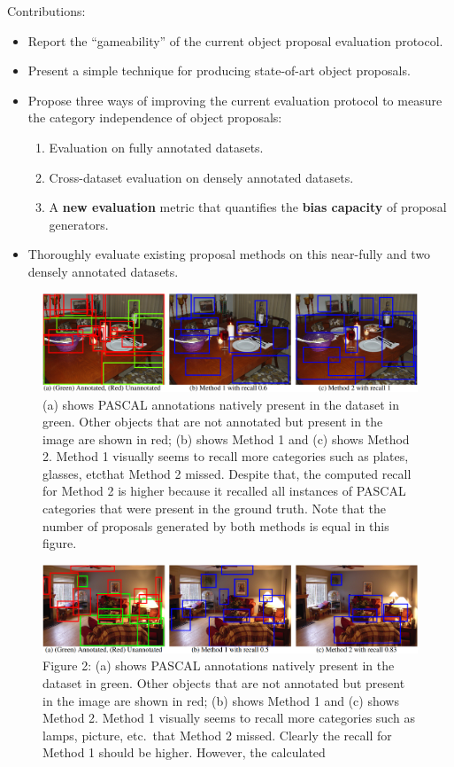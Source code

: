 \documentclass[10pt]{article}
\begin{document}
Contributions:
%
\begin{itemize}
  \item Report the ``gameability'' of the current object proposal evaluation
    protocol.
  \item Present a simple technique for producing state-of-art object proposals.
  \item Propose three ways of improving the current evaluation protocol to
    measure the category independence of object proposals:
    \begin{enumerate}
      \item Evaluation on fully annotated datasets.
      \item Cross-dataset evaluation on densely annotated datasets.
      \item A \textbf{new evaluation} metric that quantifies the
        \textbf{bias capacity} of proposal generators.
    \end{enumerate}
  \item Thoroughly evaluate existing proposal methods on this near-fully and
    two densely annotated datasets.
\end{itemize}
%
\begin{figure}[htpb]
  \centering
  \includegraphics[width=0.8\linewidth]{fig_1.png}
  \caption{(a) shows PASCAL annotations natively present in the dataset in
    green. Other objects that are not annotated but present in the image are
    shown in red; (b) shows Method 1 and (c) shows Method 2. Method 1 visually
    seems to recall more categories such as plates, glasses, etc\. that Method
    2 missed. Despite that, the computed recall for Method 2 is higher because
    it recalled all instances of PASCAL categories that were present in the
    ground truth. Note that the number of proposals generated by both methods
    is equal in this figure.}%
  \label{fig:1}
\end{figure}

\begin{figure}[htpb]
  \centering
  \includegraphics[width=0.8\linewidth]{fig_2.png}
  \caption{Figure 2: (a) shows PASCAL annotations natively present in the
    dataset in green. Other objects that are not annotated but present in the
    image are shown in red; (b) shows Method 1 and (c) shows Method 2. Method 1
    visually seems to recall more categories such as lamps, picture, etc.\ that
    Method 2 missed. Clearly the recall for Method 1 should be higher. However,
    the calculated}%
  \label{fig:2}
\end{figure}
\end{document}
